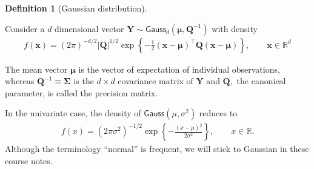 \documentclass[
  11pt,
  letterpaper,
]{scrbook}
\theoremstyle{definition}
\theoremstyle{plain}
\theoremstyle{plain}
\theoremstyle{plain}
\theoremstyle{definition}
\theoremstyle{definition}
\newtheorem{definition}{Definition}[chapter]
\theoremstyle{plain}
\theoremstyle{plain}
\theoremstyle{remark}
\begin{document}
\begin{definition}[Gaussian
distribution]\protect\hypertarget{def-gaussian}{}\label{def-gaussian}

Consider a \(d\) dimensional vector
\(\boldsymbol{Y} \sim \mathsf{Gauss}_d(\boldsymbol{\mu}, \boldsymbol{Q}^{-1})\)
with density \begin{align*}
f(\boldsymbol{x}) = (2\pi)^{-d/2} |\boldsymbol{Q}|^{1/2} \exp \left\{ - \frac{1}{2} (\boldsymbol{x}-\boldsymbol{\mu})^\top \boldsymbol{Q}(\boldsymbol{x}-\boldsymbol{\mu})\right\}, \qquad \boldsymbol{x} \in \mathbb{R}^d
\end{align*}

The mean vector \(\boldsymbol{\mu}\) is the vector of expectation of
individual observations, whereas
\(\boldsymbol{Q}^{-1}\equiv \boldsymbol{\Sigma}\) is the \(d \times d\)
covariance matrix of \(\boldsymbol{Y}\) and \(\boldsymbol{Q},\) the
canonical parameter, is called the precision matrix.

In the univariate case, the density of \(\mathsf{Gauss}(\mu, \sigma^2)\)
reduces to \begin{align*}
f(x) = (2\pi\sigma^2)^{-1/2} \exp \left\{ - \frac{(x-\mu)^2}{2\sigma^2}\right\}, \qquad x \in \mathbb{R}.
\end{align*} Although the terminology ``normal'' is frequent, we will
stick to Gaussian in these course notes.

\end{definition}
\end{document}
